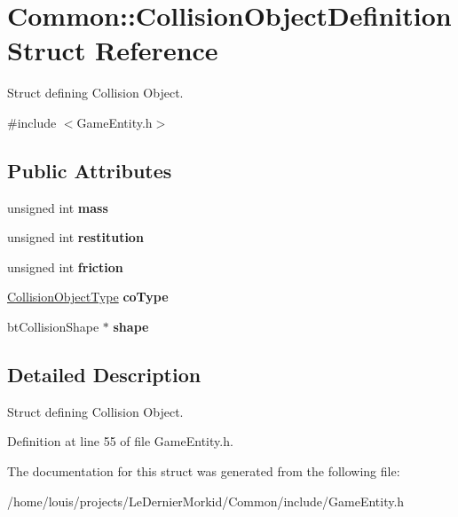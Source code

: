 \hypertarget{struct_common_1_1_collision_object_definition}{}\section{Common\+:\+:Collision\+Object\+Definition Struct Reference}
\label{struct_common_1_1_collision_object_definition}


Struct defining Collision Object.  




{\ttfamily \#include $<$Game\+Entity.\+h$>$}

\subsection*{Public Attributes}
\begin{DoxyCompactItemize}
\item 
\mbox{\label{struct_common_1_1_collision_object_definition_a472145ada80dba6a8d1831246b0ed2c3}} 
unsigned int {\bfseries mass}
\item 
\mbox{\label{struct_common_1_1_collision_object_definition_a84df96597dafbddce2bd7f8e0a8770a3}} 
unsigned int {\bfseries restitution}
\item 
\mbox{\label{struct_common_1_1_collision_object_definition_a8cf81893bc2b5cd90861239c9a758c68}} 
unsigned int {\bfseries friction}
\item 
\mbox{\label{struct_common_1_1_collision_object_definition_a9528a6850d27727bc573460430c63cf2}} 
\hyperlink{group___common_ga955f008a0c60257af5dc9f2a478be51f}{Collision\+Object\+Type} {\bfseries co\+Type}
\item 
\mbox{\label{struct_common_1_1_collision_object_definition_a9ce0f0e3eb7b066ee634bcbec7cce193}} 
bt\+Collision\+Shape $\ast$ {\bfseries shape}
\end{DoxyCompactItemize}


\subsection{Detailed Description}
Struct defining Collision Object. 

Definition at line 55 of file Game\+Entity.\+h.



The documentation for this struct was generated from the following file\+:\begin{DoxyCompactItemize}
\item 
/home/louis/projects/\+Le\+Dernier\+Morkid/\+Common/include/Game\+Entity.\+h\end{DoxyCompactItemize}
